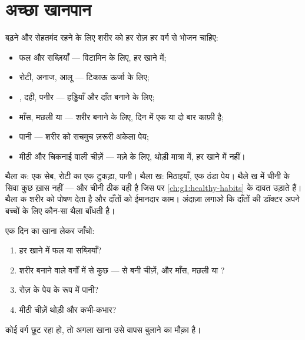 \section{अच्छा खानपान}

\begin{proposition}[संतुलित थाली]\label{prop:g2:teeth-and-eating-well:balanced}
बढ़ने और सेहतमंद रहने के लिए शरीर को हर रोज़ हर वर्ग से भोजन चाहिए:
\begin{itemize}
  \item फल और सब्ज़ियाँ --- विटामिन के लिए, हर खाने में;
  \item रोटी, अनाज, आलू --- टिकाऊ ऊर्जा के लिए;
  \item {}, दही, पनीर --- हड्डियाँ और दाँत बनाने के लिए;
  \item माँस, मछली या  --- शरीर बनाने के लिए, दिन में एक या दो
        बार काफ़ी है;
  \item पानी --- शरीर को सचमुच ज़रूरी अकेला पेय;
  \item मीठी और चिकनाई वाली चीज़ें --- मज़े के लिए, थोड़ी मात्रा में,
        हर खाने में नहीं।
\end{itemize}
\end{proposition}
\admitted

\begin{example}[दो नाश्ते के थैले]\label{ex:g2:teeth-and-eating-well:snack}
थैला क: एक सेब, रोटी का एक टुकड़ा, पानी। थैला ख: मिठाइयाँ, एक ठंडा
पेय। थैले ख में चीनी के सिवा कुछ ख़ास नहीं --- और चीनी ठीक वही है
जिस पर \cref{ch:g1:healthy-habits} के  दावत उड़ाते हैं। थैला क
शरीर को पोषण देता है और दाँतों को ईमानदार काम। अंदाज़ा लगाओ कि दाँतों
की डॉक्टर अपने बच्चों के लिए कौन-सा थैला बाँधती है।
\end{example}

\begin{method}[दिन भर का मेनू जाँचना]\label{met:g2:teeth-and-eating-well:check}
एक दिन का खाना लेकर जाँचो:
\begin{enumerate}
  \item हर खाने में फल या सब्ज़ियाँ?
  \item शरीर बनाने वाले वर्गों में से कुछ ---  से बनी चीज़ें, और
        माँस, मछली या ?
  \item रोज़ के पेय के रूप में पानी?
  \item मीठी चीज़ें थोड़ी और कभी-कभार?
\end{enumerate}
कोई वर्ग छूट रहा हो, तो अगला खाना उसे वापस बुलाने का मौक़ा है।
\end{method}

